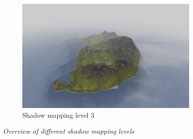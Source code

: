 \begin{figure}[H]
\begin{subfigure}{\textwidth/3}
  \centering
  \includegraphics[width=0.9\linewidth]{images/SMOverViewLvl3.jpg}
  \caption{Shadow mapping level 3}
  \label{fig:SMOverViewLvl3}
\end{subfigure}
\caption[Noise comparison]{\textit{Overview of different shadow mapping levels}}
\label{fig:SMOverViewComparison}
\end{figure}

